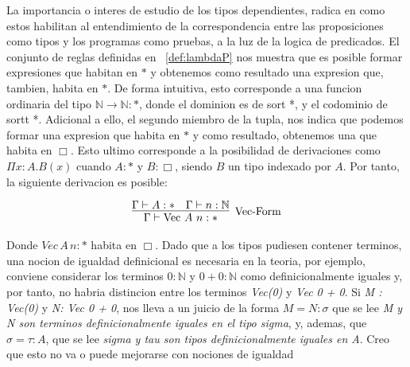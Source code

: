 \documentclass[a4paper,12pt]{report}
\theoremstyle{definition}
\theoremstyle{plain}
\theoremstyle{remark}
\begin{document}
    La importancia o interes de estudio de los tipos dependientes, radica en como estos habilitan al entendimiento de la correspondencia entre las proposiciones como tipos y los programas como pruebas, a la luz de la logica de predicados. El conjunto de reglas definidas en ~\ref{def:lambdaP} nos muestra que es posible formar expresiones que habitan en $*$ y obtenemos como resultado una expresion que, tambien, habita en $*$. De forma intuitiva, esto corresponde a una funcion ordinaria del tipo $\mathbb{N}\to\mathbb{N} : *$, donde el dominion es de sort *, y el codominio de sortt *. Adicional a ello, el segundo miembro de la tupla, nos indica que podemos formar una expresion que habita en $*$ y como resultado, obtenemos una que habita en $\Box$. Esto ultimo corresponde a la posibilidad de derivaciones como $\Pi x : A . B(x)$ cuando $A : *$ y $B : \Box$, siendo $B$ un tipo indexado por $A$. Por tanto, la siguiente derivacion es posible:
    
\begin{gather}
  \infer[\text{Vec-Form}]
  {\Gamma \vdash \mathrm{Vec}\ A\ n : *}
  {\Gamma \vdash A : * & \Gamma \vdash n : \mathbb{N}}
\end{gather}

Donde $\textit{Vec}\,A\, n : *$ habita en $\Box$.
\newpage
\indent Dado que a los tipos pudiesen contener terminos, una nocion de igualdad definicional es necesaria en la teoria, por ejemplo, conviene considerar los terminos $0 : \mathbb{N}$ y $0 + 0 : \mathbb{N}$ como definicionalmente iguales y, por tanto, no habria distincion entre los terminos \textit{Vec(0)} y \textit{Vec 0 + 0}. Si \textit{M : Vec(0)} y \textit{N: Vec 0 + 0}, nos lleva a un juicio de la forma $M = N : \sigma$ que se lee \textit{M y N son terminos definicionalmente iguales en el tipo sigma}, y, ademas, que $\sigma = \tau : A$, que se lee \textit{sigma y tau son tipos definicionalmente iguales en A}. Creo que esto no va o puede mejorarse con nociones de igualdad
\end{document}
